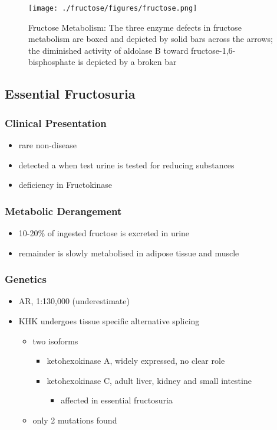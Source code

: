 \documentclass{scrartcl}
\begin{document}
\begin{figure}[htbp]
\centering
\texttt{[image: ./fructose/figures/fructose.png]}
\caption[Fructose]{\label{fig:orgc18ea7a}
Fructose Metabolism: The three enzyme defects in fructose metabolism are boxed and depicted by solid bars across the arrows; the diminished activity of aldolase B toward fructose-1,6-bisphosphate is depicted by a broken bar}
\end{figure}

\subsection{Essential Fructosuria}
\label{sec:org25d7522}
\subsubsection{Clinical Presentation}
\label{sec:org1ef7121}
\begin{itemize}
\item rare non-disease
\item detected a when test urine is tested for reducing substances
\item deficiency in Fructokinase
\end{itemize}
\subsubsection{Metabolic Derangement}
\label{sec:orgb24badd}
\begin{itemize}
\item 10-20\% of ingested fructose is excreted in urine
\item remainder is slowly metabolised in adipose tissue and muscle
\end{itemize}
\subsubsection{Genetics}
\label{sec:org8313586}
\begin{itemize}
\item AR, 1:130,000 (underestimate)
\item KHK undergoes tissue specific alternative splicing
\begin{itemize}
\item two isoforms
\begin{itemize}
\item ketohexokinase A, widely expressed, no clear role
\item ketohexokinase C, adult liver, kidney and small intestine
\begin{itemize}
\item affected in essential fructosuria
\end{itemize}
\end{itemize}
\item only 2 mutations found
\end{itemize}
\end{itemize}
\end{document}
